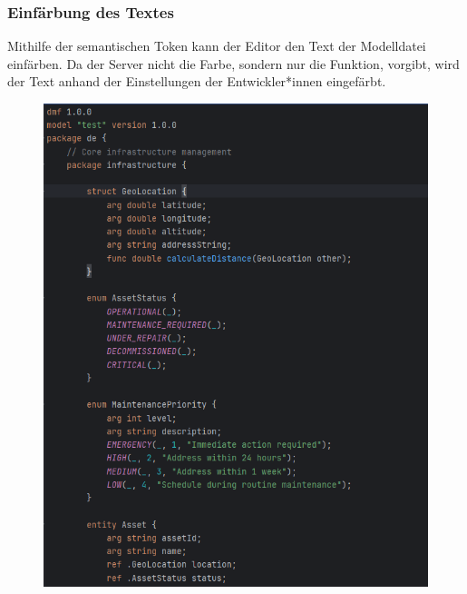 \documentclass[./einleitung.tex]{subfiles}
\begin{document}
    \subsubsection{Einfärbung des Textes}
    Mithilfe der semantischen Token kann der Editor den Text der Modelldatei einfärben.
    Da der Server nicht die Farbe, sondern nur die Funktion, vorgibt, wird der Text anhand der Einstellungen der Entwickler*innen eingefärbt.
    \begin{figure}[H]
        \centering
        \includegraphics[width=\linewidth / 2 - 1em]{bilder/semanticIntellij}

\end{figure}
\end{document}
